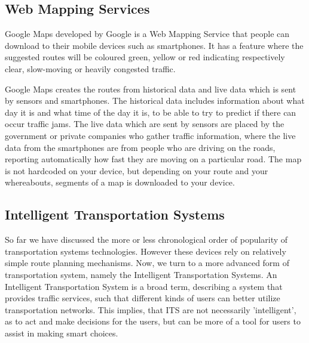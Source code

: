 \subsection*{Web Mapping Services}
%
Google Maps developed by Google is a Web Mapping Service that people can download to their mobile devices such as smartphones. It has a feature where the suggested routes will be coloured green, yellow or red indicating respectively clear, slow-moving or heavily congested traffic.

Google Maps creates the routes from historical data and live data which is sent by sensors and smartphones. The historical data includes information about what day it is and what time of the day it is, to be able to try to predict if there can occur traffic jams. The live data which are sent by sensors are placed by the government or private companies who gather traffic information, where the live data from the smartphones are from people who are driving on the roads, reporting automatically how fast they are moving on a particular road. The map is not hardcoded on your device, but depending on your route and your whereabouts, segments of a map is downloaded to your device.


\subsection*{Intelligent Transportation Systems}
So far we have discussed the more or less chronological order of popularity of transportation systems technologies. However these devices rely on relatively simple route planning mechanisms. Now, we turn to a more advanced form of transportation system, namely the Intelligent Transportation Systems. An Intelligent Transportation System is a broad term, describing a system that provides traffic services, such that different kinds of users can better utilize transportation networks. This implies, that ITS are not necessarily 'intelligent', as to act and make decisions for the users, but can be more of a tool for users to assist in making smart choices.


